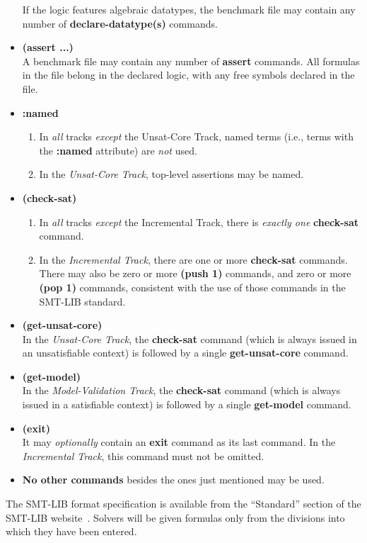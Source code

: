 \documentclass[12pt]{article}
\newcommand{\akey}[1]{\textbf{#1}\xspace}
\newcommand{\bkey}[1]{\textbf{{#1}}\xspace}
\newcommand{\inctrack}{Incremental Track\xspace}
\newcommand{\ucoretrack}{Unsat-Core Track\xspace}
\newcommand{\mvaltrack}{Model-Validation Track\xspace}
\begin{document}
\begin{itemize}
    If the logic features algebraic datatypes, the benchmark file may
    contain any number of \akey{declare-datatype(s)} commands.
  \item \bkey{(assert ...)}\\
    A benchmark file may contain any number of \akey{assert} commands.  All
    formulas in the file belong in the declared logic, with any free symbols
    declared in the file.
  \item
    \bkey{:named}
    \begin{enumerate}[label=(\alph*)]
      \vspace{-1ex}
      \item In \emph{all} tracks \emph{except} the \ucoretrack,  named
        terms (i.e., terms with the \akey{:named} attribute) are \emph{not}
        used.
      \item In the \emph{\ucoretrack}, top-level assertions may be named.
    \end{enumerate}
  \item
    \bkey{(check-sat)}
    \begin{enumerate}[label=(\alph*)]
      \vspace{-1ex}
    \item In \emph{all} tracks \emph{except} the \inctrack, there is
      \emph{exactly one} \akey{check-sat} command.
    \item In the \emph{\inctrack}, there are one or more
      \akey{check-sat} commands.  There may also be zero or more
      \akey{(push 1)} commands, and zero or more \akey{(pop 1)} commands,
      consistent with the use of those commands in the SMT-LIB standard.
    \end{enumerate}
  \item \bkey{(get-unsat-core)}\\
    In the \emph{\ucoretrack}, the \akey{check-sat} command (which is
    always issued in an unsatisfiable context) is followed by a single
    \akey{get-unsat-core} command.
  \item \bkey{(get-model)}\\
    In the \emph{\mvaltrack}, the \akey{check-sat} command (which is
    always issued in a satisfiable context) is followed by a single
    \akey{get-model} command.
  \item \bkey{(exit)}\\
    It may \emph{optionally} contain an \akey{exit} command as its
    last command.  In the \emph{\inctrack}, this command must not be
    omitted.
  \item \textbf{No other commands} besides the ones just mentioned may be used.
\end{itemize}
%
The SMT-LIB format specification is available from the ``Standard''
section of the SMT-LIB website~\cite{SMT-LIB}.  Solvers will be given
formulas only from the divisions into which they have been entered.
\end{document}
